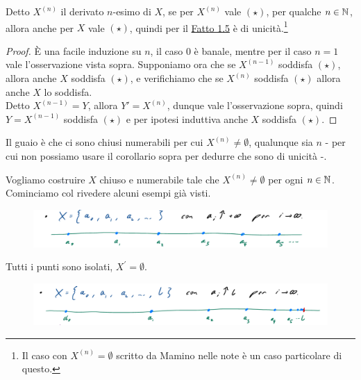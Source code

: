 \begin{corollary}
Detto $X^{(n)}$ il derivato $n$-esimo di $X$, se per $X^{(n)}$ vale $(\star)$, per qualche $n \in \mathbb N$, allora anche per $X$ vale $(\star)$, quindi per il \hyperref[unicità]{Fatto 1.5} è di unicità.\footnote{Il caso con $X^{(n)} = \emptyset$ scritto da Mamino nelle note è un caso particolare di questo.}
\end{corollary}

\begin{proof}
È una facile induzione su $n$, il caso $0$ è banale, mentre per il caso $n = 1$ vale l'osservazione vista sopra. Supponiamo ora che se $X^{(n-1)}$ soddisfa $(\star)$, allora 
anche $X$ soddisfa $(\star)$, e verifichiamo che se $X^{(n)}$ soddisfa $(\star)$ allora anche $X$ lo soddisfa.\\
Detto $X^{(n-1)} = Y$, allora $Y' = X^{(n)}$, dunque vale l'osservazione sopra, quindi $Y = X^{(n-1)}$ soddisfa $(\star)$ e per ipotesi induttiva anche $X$ soddisfa $(\star)$.
\end{proof}

Il guaio è che ci sono chiusi numerabili per cui $X^{(n)} \ne \emptyset$, qualunque sia $n$ - per cui non possiamo usare il corollario sopra per dedurre che sono di unicità -.

\begin{example}
Vogliamo costruire $X$ chiuso e numerabile tale che $X^{(n)} \ne \emptyset$ per ogni $n \in \mathbb N$. Cominciamo col rivedere alcuni esempi già visti.
\end{example}

\begin{figure}[H]
		\centering
		\includegraphics[scale = 0.3]{immagini/es1.png}
\end{figure}

Tutti i punti sono isolati, $X^{\prime} = \emptyset$.

\begin{figure}[H]
	\centering
	\includegraphics[scale = 0.3]{immagini/es2.png}
\end{figure}

